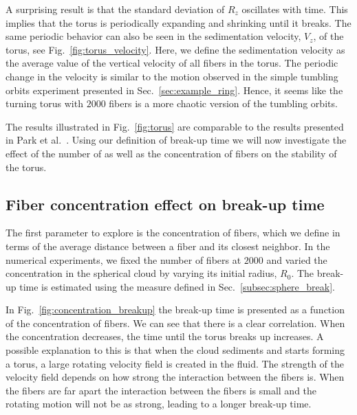 A surprising result is that the standard deviation of $R_z$ oscillates with time. This implies that the torus is periodically expanding and shrinking until it breaks. The same periodic behavior can also be seen in the sedimentation velocity, $V_z$, of the torus, see Fig.~\ref{fig:torus_velocity}. Here, we define the sedimentation velocity as the average value of the vertical velocity of all fibers in the torus. The periodic change in the velocity is similar to the motion observed in the simple tumbling orbits experiment presented in Sec.~\ref{sec:example_ring}. Hence, it seems like the turning torus with $2000$ fibers is a more chaotic version of the tumbling orbits.

The results illustrated in Fig.~\ref{fig:torus} are comparable to the results presented in Park et al.~\cite{Park2010}. Using our definition of break-up time we will now investigate the effect of the number of as well as the concentration of fibers on the stability of the torus.

\subsection{Fiber concentration effect on break-up time}
\label{subsec:effect_concentration}

The first parameter to explore is the concentration of fibers, which we define in terms of the average distance between a fiber and its closest neighbor. In the numerical experiments, we fixed the number of fibers at $2000$ and varied the concentration in the spherical cloud by varying its initial radius, $R_0$. The break-up time is estimated using the measure defined in Sec.~\ref{subsec:sphere_break}.

In Fig.~\ref{fig:concentration_breakup} the break-up time is presented as a function of the concentration of fibers. We can see that there is a clear correlation. When the concentration decreases, the time until the torus breaks up increases. A possible explanation to this is that when the cloud sediments and starts forming a torus, a large rotating velocity field is created in the fluid. The strength of the velocity field depends on how strong the interaction between the fibers is. When the fibers are far apart the interaction between the fibers is small and the rotating motion will not be as strong, leading to a longer break-up time.

